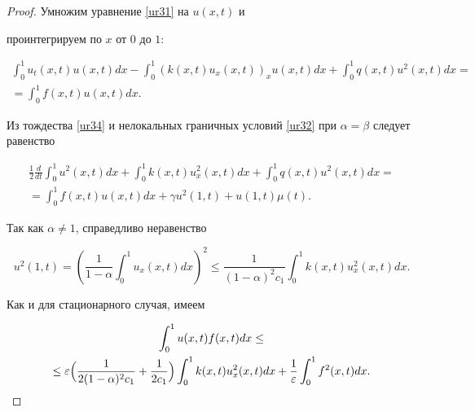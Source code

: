 \begin{proof} Умножим уравнение \eqref{ur31} на $u(x,t)$ и

проинтегрируем по $x$ от $0$ до $1$:

\begin{multline}

\int_{0}^{1}u_t(x,t)u(x,t)dx-\int_{0}^{1}(k(x,t)u_x(x,t))_xu(x,t)dx+

\int_{0}^{1}q(x,t)u^2(x,t)dx=

\\

=\int_{0}^{1}f(x,t)u(x,t)dx.

 \label{ur34}

\end{multline}



Из тождества \eqref{ur34} и нелокальных граничных условий \eqref{ur32} при $\alpha=\beta$  следует равенство

\begin{multline}

\frac{1}{2}\frac{d}{dt}\int_{0}^{1}u^2(x,t)dx+\int_{0}^{1}k(x,t)u_x^2(x,t)dx+

\int_{0}^{1}q(x,t)u^2(x,t)dx=

\\

=\int_{0}^{1}f(x,t)u(x,t)dx+\gamma u^2(1,t)+u(1,t)\mu(t).

 \label{ur35}

\end{multline}



Так как $\alpha\neq1$, справедливо неравенство

$$

u^2(1,t)=\left(\frac{1}{1-\alpha}\int_{0}^{1}u_x(x,t)dx\right)^2\leq\frac{1}{(1-\alpha)^2c_1}\int_{0}^{1}k(x,t)u_x^2(x,t)dx.

$$

Как и для стационарного случая, имеем

\begin{multline*}

\int_{0}^{1}u(x,t)f(x,t)dx\leq

\\

\leq\varepsilon

\Bigl(\frac{1}{2(1-\alpha)^2c_1}+\frac{1}{2c_1}\Bigr)\int_{0}^{1}k(x,t)u_x^2(x,t)dx+\frac{1}{\varepsilon}\int_{0}^{1}f^2(x,t)dx.

\end{multline*}


\end{proof}

